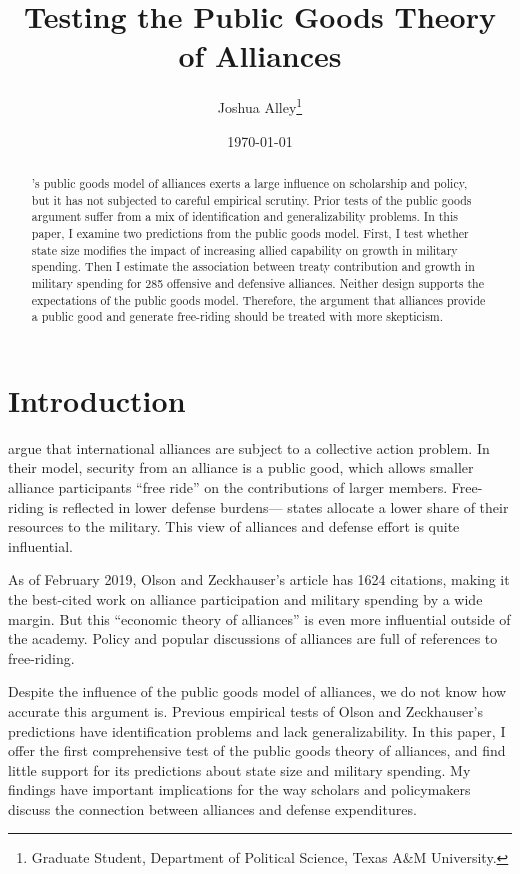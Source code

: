 \documentclass[12pt]{article}
\title{
\textbf{Testing the Public Goods Theory of Alliances}
	}
\author{Joshua Alley\footnote{Graduate Student,
Department of Political Science, Texas A\&M University.}}
\date{{\normalsize \today}}
\begin{document}
\maketitle 

\doublespace

\begin{abstract}
\citet{OlsonZeckhauser1966}'s public goods model of alliances exerts a large influence on scholarship and policy, but it has not subjected to careful empirical scrutiny. 
Prior tests of the public goods argument suffer from a mix of identification and generalizability problems. 
In this paper, I examine two predictions from the public goods model. 
First, I test whether state size modifies the impact of increasing allied capability on growth in military spending. 
Then I estimate the association between treaty contribution and growth in military spending for 285 offensive and defensive alliances. 
Neither design supports the expectations of the public goods model. 
Therefore, the argument that alliances provide a public good and generate free-riding should be treated with more skepticism. 

\end{abstract} 



\section{Introduction}



\citet{OlsonZeckhauser1966} argue that international alliances are subject to a collective action problem. 
In their model, security from an alliance is a public good, which allows smaller alliance participants ``free ride'' on the contributions of larger members. 
Free-riding is reflected in lower defense burdens--- states allocate a lower share of their resources to the military.
This view of alliances and defense effort is quite influential. 


As of February 2019, Olson and Zeckhauser's article has 1624 citations, making it the best-cited work on alliance participation and military spending by a wide margin. 
But this ``economic theory of alliances'' is even more influential outside of the academy. 
Policy and popular discussions of alliances are full of references to free-riding.


Despite the influence of the public goods model of alliances, we do not know how accurate this argument is. 
Previous empirical tests of Olson and Zeckhauser's predictions have identification problems and lack generalizability. 
In this paper, I offer the first comprehensive test of the public goods theory of alliances, and find little support for its predictions about state size and military spending. 
My findings have important implications for the way scholars and policymakers discuss the connection between alliances and defense expenditures. 
 
\end{document}
